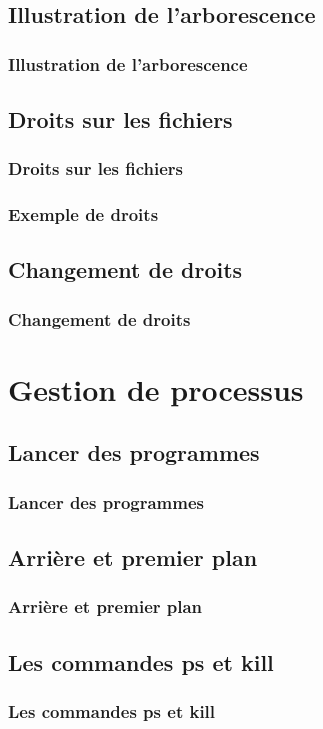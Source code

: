 \documentclass{beamer}
\begin{document}
    \subsection{Illustration de l'arborescence}
    \begin{frame}
        \frametitle{Illustration de l'arborescence}
    \end{frame}

    \subsection{Droits sur les fichiers}
    \begin{frame}
        \frametitle{Droits sur les fichiers}
    \end{frame}

    \begin{frame}
        \frametitle{Exemple de droits}
    \end{frame}

    \subsection{Changement de droits}
    \begin{frame}
        \frametitle{Changement de droits}
    \end{frame}
    
    \section{Gestion de processus}
    \subsection{Lancer des programmes}
    \begin{frame}
        \frametitle{Lancer des programmes}
    \end{frame}

    \subsection{Arrière et premier plan}
    \begin{frame}
        \frametitle{Arrière et premier plan}
    \end{frame}

    \subsection{Les commandes ps et kill}
    \begin{frame}
        \frametitle{Les commandes ps et kill}
    \end{frame}
\end{document}
